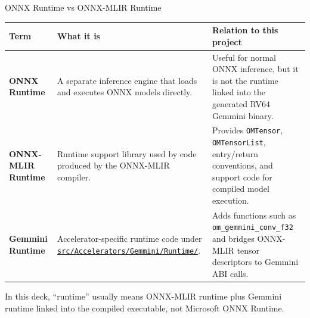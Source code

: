 \documentclass[aspectratio=169,10pt]{beamer}
\newcommand{\code}[1]{\texttt{\footnotesize #1}}
\newcommand{\repoRoot}{/home/lahcen/toolchains/onnx-mlir-xcompile/onnx-mlir}
\newcommand{\pathcode}[1]{\href{run:\repoRoot/#1}{\texttt{\scriptsize #1}}}
\newcommand{\edgeword}[1]{\textcolor{red!75!black}{\textbf{#1}}}
\begin{document}
\begin{frame}{ONNX Runtime vs ONNX-MLIR Runtime}
  \scriptsize
  \begin{tabularx}{\textwidth}{@{}lXX@{}}
    \toprule
    Term & What it is & Relation to this project \\
    \midrule
    \edgeword{ONNX Runtime} &
      A separate inference engine that loads and executes ONNX models directly. &
      Useful for normal ONNX inference, but it is not the runtime linked into the generated RV64 Gemmini binary. \\
    \edgeword{ONNX-MLIR Runtime} &
      Runtime support library used by code produced by the ONNX-MLIR compiler. &
      Provides \code{OMTensor}, \code{OMTensorList}, entry/return conventions, and support code for compiled model execution. \\
    \edgeword{Gemmini Runtime} &
      Accelerator-specific runtime code under \pathcode{src/Accelerators/Gemmini/Runtime/}. &
      Adds functions such as \code{om\_gemmini\_conv\_f32} and bridges ONNX-MLIR tensor descriptors to Gemmini ABI calls. \\
    \bottomrule
  \end{tabularx}
  \vspace{0.3em}
  \centering
  \vspace{0.2em}
  {\tiny\color{codegray}
  In this deck, ``runtime'' usually means ONNX-MLIR runtime plus Gemmini runtime linked into the compiled executable, not Microsoft ONNX Runtime.}
\end{frame}
\end{document}
